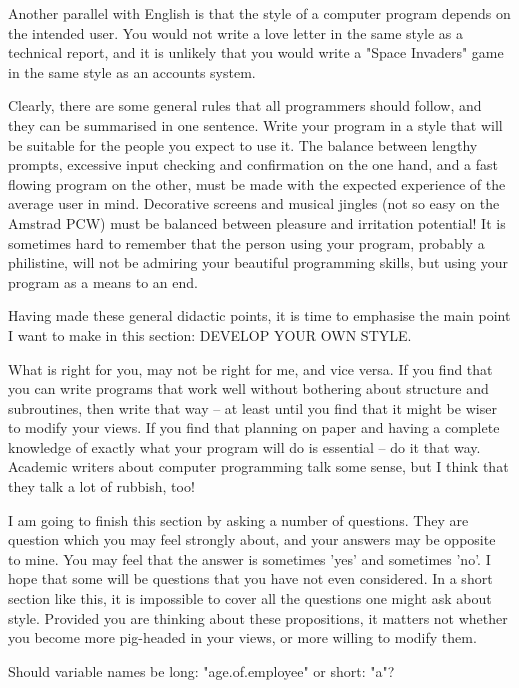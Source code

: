 Another parallel with English is that the style of a computer program  depends 
on the intended user. You would not write a love letter in the same style as a 
technical  report, and it is unlikely that you would write a "Space  Invaders" 
game in the same style as an accounts system.

Clearly, there are some general rules that all programmers should follow,  and 
they  can  be summarised in one sentence. Write your program in a  style  that 
will  be  suitable for the people you expect to use it.  The  balance  between 
lengthy  prompts, excessive input checking and confirmation on the  one  hand, 
and  a  fast  flowing program on the other, must be  made  with  the  expected 
experience of the average user in mind. Decorative screens and musical jingles 
(not  so  easy  on  the Amstrad PCW) must be  balanced  between  pleasure  and 
irritation  potential! It is sometimes hard to remember that the person  using 
your  program,  probably  a philistine, will not be  admiring  your  beautiful 
programming skills, but using your program as a means to an end.

Having  made these general didactic points, it is time to emphasise  the  main 
point I want to make in this section: DEVELOP YOUR OWN STYLE.

What  is right for you, may not be right for me, and vice versa. If  you  find 
that  you can write programs that work well without bothering about  structure 
and subroutines, then write that way -- at least until you find that it  might 
be wiser to modify your views. If you find that planning on paper and having a 
complete knowledge of exactly what your program will do is essential -- do  it 
that  way. Academic writers about computer programming talk some sense, but  I 
think that they talk a lot of rubbish, too!

I  am going to finish this section by asking a number of questions.  They  are 
question  which you may feel strongly about, and your answers may be  opposite 
to mine. You may feel that the answer is sometimes 'yes' and sometimes 'no'. I 
hope that some will be questions that you have not even considered. In a short 
section  like this, it is impossible to cover all the questions one might  ask 
about  style. Provided you are thinking about these propositions,  it  matters 
not  whether  you  become more pig-headed in your views, or  more  willing  to 
modify them.

Should variable names be long: "age.of.employee" or short: "a"?

